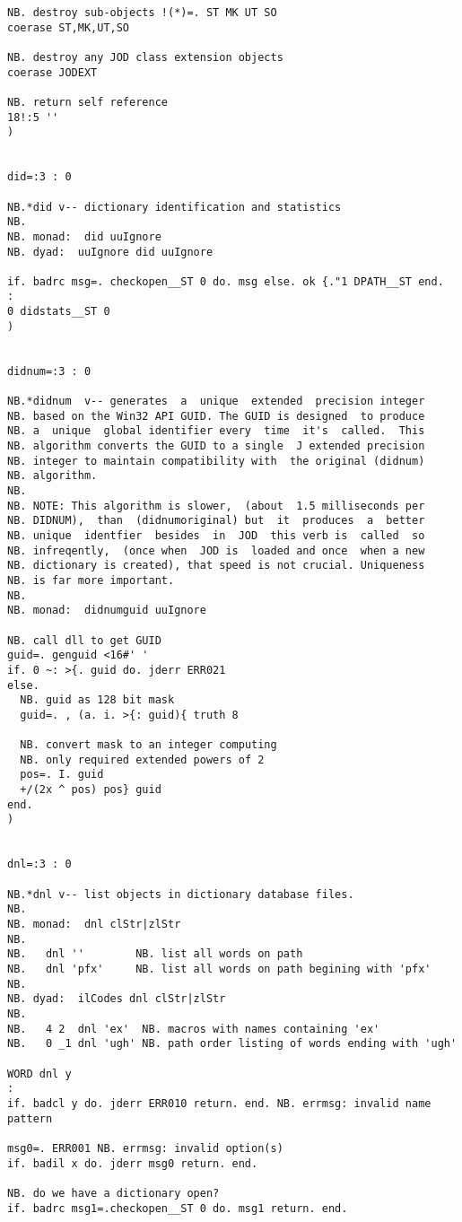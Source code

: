 \begin{lstlisting}[frame=single,framerule=0pt,basicstyle=\ttfamily\tiny]
NB. destroy sub-objects !(*)=. ST MK UT SO
coerase ST,MK,UT,SO

NB. destroy any JOD class extension objects
coerase JODEXT

NB. return self reference
18!:5 ''
)


did=:3 : 0

NB.*did v-- dictionary identification and statistics
NB.
NB. monad:  did uuIgnore
NB. dyad:  uuIgnore did uuIgnore

if. badrc msg=. checkopen__ST 0 do. msg else. ok {."1 DPATH__ST end.
:
0 didstats__ST 0
)


didnum=:3 : 0

NB.*didnum  v-- generates  a  unique  extended  precision integer
NB. based on the Win32 API GUID. The GUID is designed  to produce
NB. a  unique  global identifier every  time  it's  called.  This
NB. algorithm converts the GUID to a single  J extended precision
NB. integer to maintain compatibility with  the original (didnum)
NB. algorithm.
NB.
NB. NOTE: This algorithm is slower,  (about  1.5 milliseconds per
NB. DIDNUM),  than  (didnumoriginal) but  it  produces  a  better
NB. unique  identfier  besides  in  JOD  this verb is  called  so
NB. infreqently,  (once when  JOD is  loaded and once  when a new
NB. dictionary is created), that speed is not crucial. Uniqueness
NB. is far more important.
NB.
NB. monad:  didnumguid uuIgnore

NB. call dll to get GUID
guid=. genguid <16#' '
if. 0 ~: >{. guid do. jderr ERR021
else.
  NB. guid as 128 bit mask
  guid=. , (a. i. >{: guid){ truth 8

  NB. convert mask to an integer computing
  NB. only required extended powers of 2
  pos=. I. guid
  +/(2x ^ pos) pos} guid
end.
)


dnl=:3 : 0

NB.*dnl v-- list objects in dictionary database files.
NB.
NB. monad:  dnl clStr|zlStr
NB.
NB.   dnl ''        NB. list all words on path
NB.   dnl 'pfx'     NB. list all words on path begining with 'pfx'
NB.
NB. dyad:  ilCodes dnl clStr|zlStr
NB.
NB.   4 2  dnl 'ex'  NB. macros with names containing 'ex'
NB.   0 _1 dnl 'ugh' NB. path order listing of words ending with 'ugh'

WORD dnl y
:
if. badcl y do. jderr ERR010 return. end. NB. errmsg: invalid name pattern

msg0=. ERR001 NB. errmsg: invalid option(s)
if. badil x do. jderr msg0 return. end.

NB. do we have a dictionary open?
if. badrc msg1=.checkopen__ST 0 do. msg1 return. end.


\end{lstlisting}
